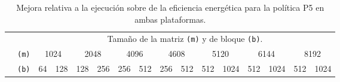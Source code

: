 \begin{table}
  \centering
  \caption[Mejora eficiencia energética para la política P5]{Mejora relativa a la ejecución sobre \botlev de la eficiencia energética para la política P5 en ambas plataformas.}
  \label{tab:mejora-gflopsw-p5}
  {\scriptsize
    \begin{tabular}{cccccccccccccccc}
      \toprule
  \multicolumn{2}{c}{\phantom{a}} & \multicolumn{14}{c}{Tamaño de la matriz \texttt{(m)} y
                                        de bloque \texttt{(b)}.} \\ \cmidrule{2-16}
      \phantom{4} & \texttt{(m)} & \multicolumn{2}{c}{1024} & \multicolumn{2}{c}{2048} &                                                                         \multicolumn{2}{c}{4096} & \multicolumn{2}{c}{4608} & \multicolumn{2}{c}{5120} & \multicolumn{2}{c}{6144} & \multicolumn{2}{c}{8192} \\
      \phantom{a} & \texttt{(b)} & 64 & 128 & 128 & 256 & 256 & 512 & 256 & 512 & 512 & 1024 & 512 & 1024 & 512 & 1024 \\ \hline




\end{tabular}}
\end{table}
